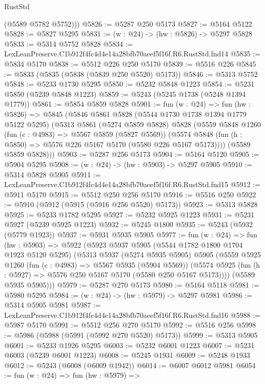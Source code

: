 \begin{lexlean}{RustStd}
\begin{coremodule}
        (@5589 @5782 @5752)))
@5826 := @5287 @250 @5173
@5827 := @5164 @5122
@5828 := @5827 @5295
@5831 := (w : @24) -> (hw : @5826) -> @5297 @5828
@5833 := @5314 @5752 @5828
@5834 := LexLeanPreserve.C1b912f4fc4d4e14a28bfb70aeef5f16f.R6.RustStd.fnd14
@5835 := @5834 @5170
@5838 := @5512 @226 @250 @5170
@5839 := @5516 @226
@5845 := @5833 (@5835 (@5838 (@5839 @250 @5520) @5173))
@5846 := @5313 @5752
@5848 := @5233 @1730 @5295
@5850 := @5232 @5848 @1223
@5854 := @5231 @5850 (@5239 @5848 @1223)
@5859 := @5243 (@5245 @1738 (@5248 @1394 @1779))
@5861 := @5854 @5859 @5828
@5901 := fun (w : @24) =>
  fun (hw : @5826) =>
  @5845
    (@5846
      @5861
      @5828
      (@5544 @1730 @1738 @1394 @1779 @5122 @5295)
      (@5313
        @5861
        (@5274 @5859 @5828)
        @5828
        (@5559
          @5848
          @1260
          (fun (c : @4983) => @5567 @5859 (@5827 @5569))
          (@5574 @5848 (fun (h : @5850) => @5576 @226 @5167 @5170 (@5580 @226 @5167 @5173))))
        (@5589 @5859 @5828)))
@5903 := @5287 @256 @5173
@5904 := @5164 @5120
@5905 := @5904 @5295
@5908 := (w : @24) -> (hw : @5903) -> @5297 @5905
@5910 := @5314 @5828 @5905
@5911 := LexLeanPreserve.C1b912f4fc4d4e14a28bfb70aeef5f16f.R6.RustStd.fnd15
@5912 := @5911 @5170
@5915 := @5512 @250 @256 @5170
@5916 := @5516 @250
@5922 := @5910 (@5912 (@5915 (@5916 @256 @5520) @5173))
@5923 := @5313 @5828
@5925 := @5233 @1782 @5295
@5927 := @5232 @5925 @1223
@5931 := @5231 @5927 (@5239 @5925 @1223)
@5932 := @5245 @1800
@5935 := @5243 (@5932 (@5779 @1923))
@5937 := @5931 @5935 @5905
@5977 := fun (w : @24) =>
  fun (hw : @5903) =>
  @5922
    (@5923
      @5937
      @5905
      (@5544 @1782 @1800 @1704 @1923 @5120 @5295)
      (@5313
        @5937
        (@5274 @5935 @5905)
        @5905
        (@5559
          @5925
          @1260
          (fun (c : @4983) => @5567 @5935 (@5904 @5569))
          (@5574 @5925 (fun (h : @5927) => @5576 @250 @5167 @5170 (@5580 @250 @5167 @5173))))
        (@5589 @5935 @5905)))
@5979 := @5287 @270 @5173
@5980 := @5164 @5118
@5981 := @5980 @5295
@5984 := (w : @24) -> (hw : @5979) -> @5297 @5981
@5986 := @5314 @5905 @5981
@5987 := LexLeanPreserve.C1b912f4fc4d4e14a28bfb70aeef5f16f.R6.RustStd.fnd16
@5988 := @5987 @5170
@5991 := @5512 @256 @270 @5170
@5992 := @5516 @256
@5998 := @5986 (@5988 (@5991 (@5992 @270 @5520) @5173))
@5999 := @5313 @5905
@6001 := @5233 @1926 @5295
@6003 := @5232 @6001 @1223
@6007 := @5231 @6003 (@5239 @6001 @1223)
@6008 := @5245 @1931
@6009 := @5248 @1933
@6012 := @5243 (@6008 (@6009 @1942))
@6014 := @6007 @6012 @5981
@6054 := fun (w : @24) =>
  fun (hw : @5979) =>

\end{coremodule}
\end{lexlean}
